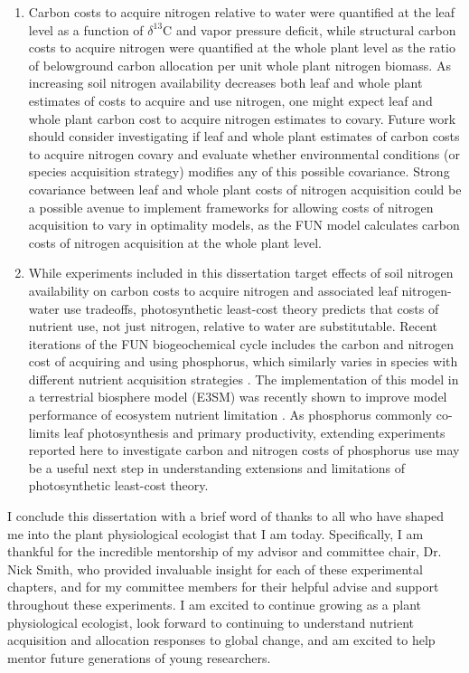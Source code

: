 \begin{enumerate}
    \item Carbon costs to acquire nitrogen relative to water were quantified at the leaf level as a function of $\delta^{13}$C and vapor pressure deficit, while structural carbon costs to acquire nitrogen were quantified at the whole plant level as the ratio of belowground carbon allocation per unit whole plant nitrogen biomass. As increasing soil nitrogen availability decreases both leaf and whole plant estimates of costs to acquire and use nitrogen, one might expect leaf and whole plant carbon cost to acquire nitrogen estimates to covary. Future work should consider investigating if leaf and whole plant estimates of carbon costs to acquire nitrogen covary and evaluate whether environmental conditions (or species acquisition strategy) modifies any of this possible covariance. Strong covariance between leaf and whole plant costs of nitrogen acquisition could be a possible avenue to implement frameworks for allowing costs of nitrogen acquisition to vary in optimality models, as the FUN model calculates carbon costs of nitrogen acquisition at the whole plant level.
    
    \item While experiments included in this dissertation target effects of soil nitrogen availability on carbon costs to acquire nitrogen and associated leaf nitrogen-water use tradeoffs, photosynthetic least-cost theory predicts that costs of nutrient use, not just nitrogen, relative to water are substitutable. Recent iterations of the FUN biogeochemical cycle includes the carbon and nitrogen cost of acquiring and using phosphorus, which similarly varies in species with different nutrient acquisition strategies . The implementation of this model in a terrestrial biosphere model (E3SM) was recently shown to improve model performance of ecosystem nutrient limitation . As phosphorus commonly co-limits leaf photosynthesis and primary productivity, extending experiments reported here to investigate carbon and nitrogen costs of phosphorus use may be a useful next step in understanding extensions and limitations of photosynthetic least-cost theory.
\end{enumerate}

I conclude this dissertation with a brief word of thanks to all who have shaped me into the plant physiological ecologist that I am today. Specifically, I am thankful for the incredible mentorship of my advisor and committee chair, Dr. Nick Smith, who provided invaluable insight for each of these experimental chapters, and for my committee members for their helpful advise and support throughout these experiments. I am excited to continue growing as a plant physiological ecologist, look forward to continuing to understand nutrient acquisition and allocation responses to global change, and am excited to help mentor future generations of young researchers.